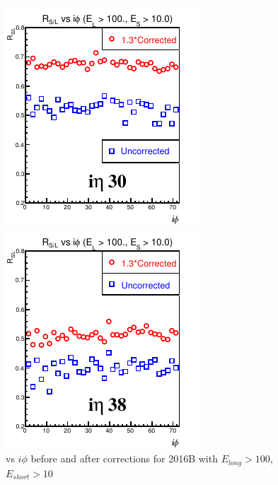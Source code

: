 \begin{figure}[!h] %
\begin{minipage}[c]{0.5\linewidth}
\centering
\includegraphics[width=0.7\linewidth]{../Figures/Chap2/ImageFiles_HF/Ratio/2016/Corrected/EnergyCut10010/ieta30Ecut4CorrectionEcut3.pdf}
\end{minipage}
\begin{minipage}[c]{0.5\linewidth}
\centering
\includegraphics[width=0.7\linewidth]{../Figures/Chap2/ImageFiles_HF/Ratio/2016/Corrected/EnergyCut10010/ieta38Ecut4CorrectionEcut3.pdf}
\end{minipage}
\caption{\ratiosl vs $i\phi$ before and after corrections for 2016B with $E_{long} > 100$, $E_{short} >10$}
\label{Ecut4CorrectionEcut3}
\end{figure}

